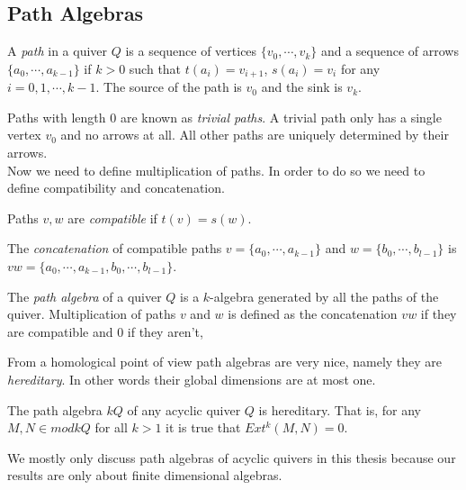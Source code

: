 \subsection{Path Algebras}
\begin{definition}
A \textit{path} in a quiver $Q$ is a sequence of vertices $\{v_0,\cdots, v_k\}$ and a sequence of arrows $\{a_0,\cdots, a_{k-1}\}$ if $k>0$ such that $t(a_i) = v_{i+1}$, $ s(a_i) = v_i$ for any $i = 0,1,\cdots, k-1$. The source of the path is $v_0$ and the sink is $v_k$.
\end{definition}
\indent Paths with length 0 are known as \textit{trivial paths}. A trivial path only has a single vertex $v_0$ and no arrows at all. All other paths are uniquely determined by their arrows.\\
\indent Now we need to define multiplication of paths. In order to do so we need to define compatibility and concatenation.\\
\begin{definition}
Paths $v,w$ are \textit{compatible} if $t(v) = s(w)$.
\end{definition}
\begin{definition}
The \textit{concatenation} of compatible paths $v = \{a_0,\cdots, a_{k-1}\}$ and $w = \{b_0,\cdots, b_{l-1}\}$ is  $vw = \{a_0,\cdots, a_{k-1}, b_0,\cdots, b_{l-1}\}$.
\end{definition}
\begin{definition}
The \textit{path algebra} of a quiver $Q$ is a $k$-algebra generated by all the paths of the quiver. Multiplication of paths $v$ and $w$ is defined as the concatenation $vw$ if they are compatible and 0 if they aren't, 
\end{definition}
\indent From a homological point of view path algebras are very nice, namely they are \textit{hereditary}. In other words their global dimensions are at most one.
\begin{theorem}
The path algebra $kQ$ of any acyclic quiver $Q$ is hereditary. That is, for any $M,N\in mod kQ$ for all $k>1$ it is true that $Ext^k(M,N)=0$.
\end{theorem}
\indent We mostly only discuss path algebras of acyclic quivers in this thesis because our results are only about finite dimensional algebras.\\
